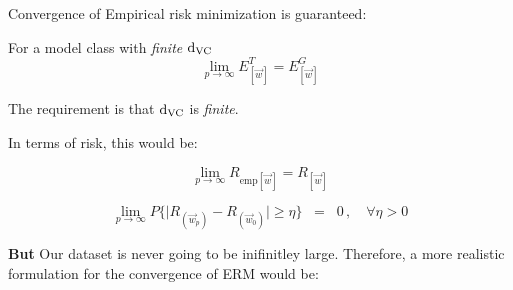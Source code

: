 \begin{frame}\frametitle{\subsecname}\label{sec:convergence_erm}
			
			Convergence of Empirical risk minimization is guaranteed:
			
			For a model class with \emph{finite} $\mathrm{d}_{\mathrm{VC}}$
			\begin{equation}
				\lim_{p \to \infty}
						E^T_{[\vec w]} = E^G_{[\vec w]}
			\end{equation}
			
			The requirement is that $\mathrm{d}_{\mathrm{VC}}$ is \emph{finite}.
			
			In terms of risk, this would be:
			
			\begin{equation}
				\lim_{p \to \infty} 
					R_{\text{emp}[\vec w]} = R_{[\vec w]}
			\end{equation}
			
			\begin{equation}
				\lim_{p \to \infty} P\bigg\{ 
					{
						\Big|R_{(\vec w_p)} - R_{(\vec w_0)}\Big| 
					}
				\geq \eta \bigg\}\;\;=\;\; 0 \,, \quad \forall \eta > 0
				\label{eq:risktozero}
			\end{equation}
			
			\textbf{But} Our dataset is never going to be inifinitley large. Therefore, a more realistic formulation for the convergence of ERM would be:
			
			
\end{frame}


